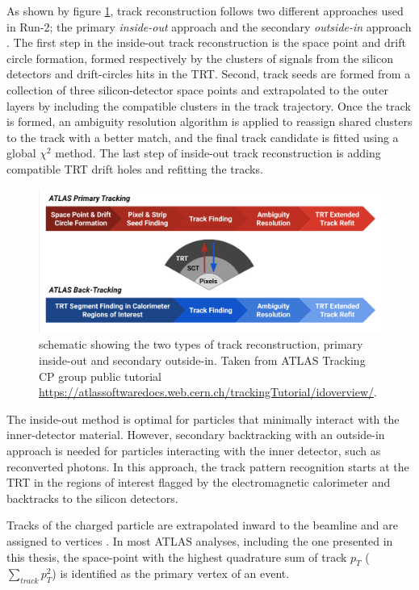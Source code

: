 As shown by figure \ref{fig:TrackingOutline}, track reconstruction follows two different approaches used in Run-2; the primary \textit{inside-out} approach and the secondary \textit{outside-in} approach \cite{TrackingRun2_ATLAS}. The first step in the inside-out track reconstruction is the space point and drift circle formation, formed respectively by the clusters of signals from the silicon detectors and drift-circles hits in the TRT. Second, track seeds are formed from a collection of three silicon-detector space points and extrapolated to the outer layers by including the compatible clusters in the track trajectory. Once the track is formed, an ambiguity resolution algorithm is applied to reassign shared clusters to the track with a better match, and the final track candidate is fitted using a global $\chi^{2}$ method. The last step of inside-out track reconstruction is adding compatible TRT drift holes and refitting the tracks. 

\begin{figure}
    \centering
    \includegraphics[width=.98\linewidth]{figures/LHC/trackingflowchart.png}
    \caption{schematic showing the two types of track reconstruction, primary inside-out and secondary outside-in. Taken from ATLAS Tracking CP group public tutorial \url{https://atlassoftwaredocs.web.cern.ch/trackingTutorial/idoverview/}. \label{fig:TrackingOutline}}
\end{figure}

The inside-out method is optimal for particles that minimally interact with the inner-detector material. However, secondary backtracking with an outside-in approach is needed for particles interacting with the inner detector, such as reconverted photons. In this approach, the track pattern recognition starts at the TRT in the regions of interest flagged by the electromagnetic calorimeter and backtracks to the silicon detectors. 

Tracks of the charged particle are extrapolated inward to the beamline and are assigned to vertices \cite{VertexReconstruction}. In most ATLAS analyses, including the one presented in this thesis, the space-point with the highest quadrature sum of track $p_T$ ($\sum_{track}{p_{T}^2}$) is identified as the primary vertex of an event.

